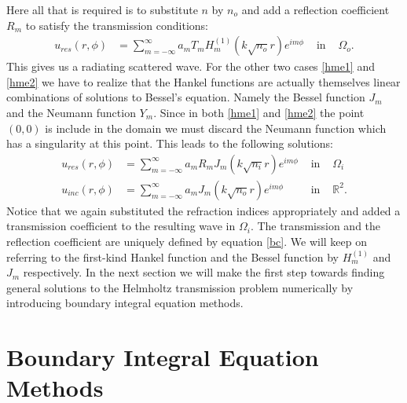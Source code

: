 \documentclass[a4paper, oneside]{thirdparty_stylesheets/discothesis}
\begin{document}
Here all that is required is to substitute $n$ by $n_o$ and add a reflection coefficient $R_m$ to satisfy the transmission conditions:
\begin{align}
	u_{res}(r,\phi) &= \sum_{m=-\infty}^{\infty} a_m T_m H_m^{(1)}(k\sqrt{n_o}r)e^{im\phi} &\text{ in }& \Omega_o.
\end{align}
This gives us a radiating scattered wave.
For the other two cases \ref{hme1} and \ref{hme2} we have to realize that the Hankel functions are actually themselves linear combinations of solutions to Bessel's equation.
Namely the Bessel function $J_m$ and the Neumann function $Y_m$.
Since in both \ref{hme1} and \ref{hme2} the point $(0,0)$ is include in the domain we must discard the Neumann function which has a singularity at this point.
This leads to the following solutions:
\begin{align}
	u_{res}(r,\phi) &=\sum_{m=-\infty}^{\infty} a_m R_m J_m(k\sqrt{n_i}r)e^{im\phi} &\text{ in } &\Omega_i \\
	u_{inc}(r,\phi) &=\sum_{m=-\infty}^{\infty} a_m J_m(k\sqrt{n_o}r)e^{im\phi} &\text{ in } &\mathbb{R}^2.
\end{align}
Notice that we again substituted the refraction indices appropriately and added a transmission coefficient to the resulting wave in $\Omega_i$.
The transmission and the reflection coefficient are uniquely defined by equation \ref{bc}.
We will keep on referring to the first-kind Hankel function and the Bessel function by $H_m^{(1)}$ and $J_m$ respectively.
In the next section we will make the first step towards finding general solutions to the Helmholtz transmission problem numerically by introducing boundary integral equation methods.

\section{Boundary Integral Equation Methods} \label{sec:BIEs}
\end{document}
